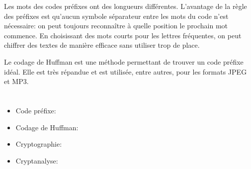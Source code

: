 {{Les mots des codes préfixes ont des longueurs différentes. L’avantage de la règle des préfixes est qu’aucun symbole séparateur entre les mots du code n’est nécessaire: on peut toujours reconnaître à quelle position le prochain mot commence. En choisissant des mots courts pour les lettres fréquentes, on peut chiffrer des textes de manière efficace sans utiliser trop de place.

Le codage de Huffman est une méthode permettant de trouver un code préfixe idéal. Elle est très répandue et est utilisée, entre autres, pour les formats JPEG et MP3.



\section*{\BrochureWebsitesAndKeywords}
{\raggedright
\begin{itemize}
  \item Code préfixe: \href{https://fr.wikipedia.org/wiki/Code_pr\%C3\%A9fixe}{}
  \item Codage de Huffman: \href{https://fr.wikipedia.org/wiki/Codage_de_Huffman}{}
  \item Cryptographie: \href{https://fr.wikipedia.org/wiki/Cryptographie}{}
  \item Cryptanalyse: \href{https://fr.wikipedia.org/wiki/Cryptanalyse}{}
\end{itemize}


}

}{}

\def\AuthorPozdniakovS{} %
\def\AuthorPosovI{} %
\def\AuthorPrettiJ{} %
\def\AuthorMalchiodiD{} %
\def\AuthorWeigendM{} %
\def\AuthorPohlW{} %
\def\AuthorDatzkoC{} %
\def\AuthorPelletE{} %

\newpage}{}

